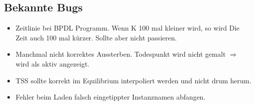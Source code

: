 \documentclass{article}
\begin{document}
\subsection{Bekannte Bugs}
	\begin{itemize}
		\item Zeitlinie bei BPDL Programm. Wenn K 100 mal kleiner wird, so wird Die Zeit auch 100 mal kürzer. Sollte aber nicht passieren.
		\item Manchmal nicht korrektes Aussterben. Todespunkt wird nicht gemalt $ \Rightarrow $ wird als aktiv angezeigt.
		\item TSS sollte korrekt im Equilibrium interpoliert werden und nicht drum herum. \checkmark
		\item Fehler beim Laden falsch eingetippter Instanznamen abfangen. \checkmark		
	\end{itemize}
	
\end{document}
